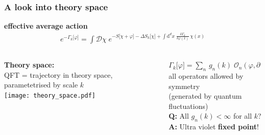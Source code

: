\documentclass[]{beamer}  %
\begin{document}
\begin{frame}
  \frametitle{A look into theory space}
  \textbf{effective average action}
  \begin{align*}
    \boxed{
    e^{ - \Gamma_k \lbrack \varphi \rbrack }
    = \int \mathcal D \chi \;
    e^{
      - S \lbrack \chi + \varphi \rbrack
      - \Delta S_k \lbrack \chi \rbrack
      + \int \mathrm d^dx \;
      \frac{ \delta \Gamma_k }{ \delta \varphi (x) }
      \, \chi(x)
    }
    }
  \end{align*}
  \vspace{2pt}

  \begin{columns}[T]
    \begin{column}{.4\textwidth}
      \textbf{Theory space:}\\[5pt]
      QFT = trajectory in theory space,
      parametetrised by scale $k$\\[25pt]
        \texttt{[image: theory\_space.pdf]}
    \end{column}
    \begin{column}{.6\textwidth}
      \begin{center}
        $\Gamma_k \lbrack \varphi \rbrack = \sum_n \, g_n(k) \; \mathcal O_n(\varphi, \partial)$\\[5pt]
        all operators allowed by symmetry\\[3pt]
        (generated by quantum fluctuations)\\[20pt]
        \pause
        \textbf{Q:} All $g_n(k)<\infty$ for all $k$?\\[5pt]
        \textbf{A:} Ultra violet \textbf{fixed point}!
      \end{center}
    \end{column}
  \end{columns}
\end{frame}
\end{document}
